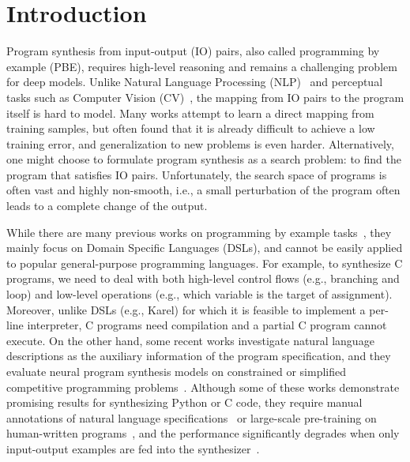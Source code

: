 \section{Introduction}
\vspace{-0.1in}
Program synthesis from input-output (IO) pairs, also called programming by example (PBE), requires high-level reasoning and remains a challenging problem for deep models. Unlike Natural Language Processing (NLP)~\cite{bahdanau2014neural,devlin2018bert} and perceptual tasks such as Computer Vision (CV)~\cite{deng2009imagenet,he2016deep}, the mapping from IO pairs to the program itself is hard to model. Many works attempt to learn a direct mapping from training samples, but often found that it is already difficult to achieve a low training error, and generalization to new problems is even harder. Alternatively, one might choose to formulate program synthesis as a search problem: to find the program that satisfies IO pairs. Unfortunately, the search space of programs is often vast and highly non-smooth, i.e., a small perturbation of the program often leads to a complete change of the output.  

While there are many previous works on programming by example tasks~\cite{balog2016deepcoder,devlin2017robustfill,bunel2018leveraging}, they mainly focus on Domain Specific Languages (DSLs), and cannot be easily applied to popular general-purpose programming languages. For example, to synthesize C programs, we need to deal with both high-level control flows (e.g., branching and loop) and low-level operations (e.g., which variable is the target of assignment). Moreover, unlike DSLs (e.g., Karel) for which it is feasible to implement a per-line interpreter, C programs need compilation and a partial C program cannot execute. On the other hand, some recent works investigate natural language descriptions as the auxiliary information of the program specification, and they evaluate neural program synthesis models on constrained or simplified competitive programming problems~\cite{kulal2019spoc,alet2021large,hendrycks2021measuring,chen2021evaluating,austin2021program}. Although some of these works demonstrate promising results for synthesizing Python or C code, they require manual annotations of natural language specifications~\cite{kulal2019spoc} or large-scale pre-training on human-written programs~\cite{chen2021evaluating,austin2021program}, and the performance significantly degrades when only input-output examples are fed into the synthesizer~\cite{alet2021large}.

